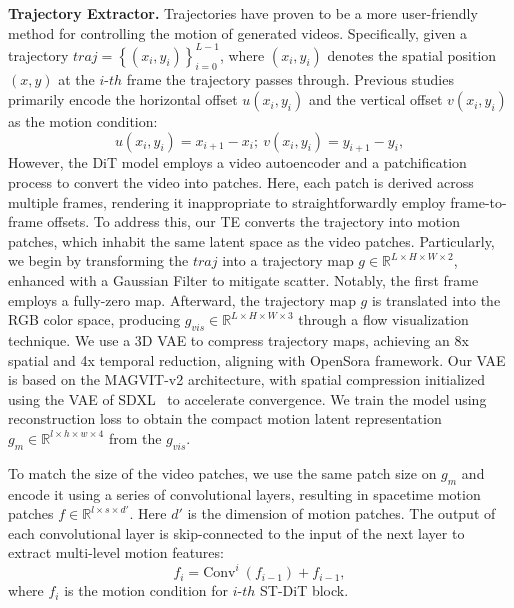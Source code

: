 \noindent \textbf{Trajectory Extractor.} Trajectories have proven to be a more user-friendly method for controlling the motion of generated videos. Specifically, given a trajectory $traj=\left \{ (x_i, y_i) \right \} _{i=0}^{L-1} $, where $(x_i, y_i)$ denotes the spatial position $(x, y)$ at the $i$-$th$ frame the trajectory passes through. Previous studies primarily encode the horizontal offset $u(x_i,y_i)$ and the vertical offset $v(x_i,y_i)$ as the motion condition: 
\begin{equation}
u(x_i,y_i)= x_{i+1} - x_{i}; ~ v(x_i,y_i)= y_{i+1} - y_{i},
\end{equation}
However, the DiT model employs a video autoencoder and a patchification process to convert the video into patches. Here, each patch is derived across multiple frames, rendering it inappropriate to straightforwardly employ frame-to-frame offsets. To address this, our TE converts the trajectory into motion patches, which inhabit the same latent space as the video patches. Particularly, we begin by transforming the $traj$ into a trajectory map $g \in \mathbb{R}^{L \times H \times W \times 2}$, enhanced with a Gaussian Filter to mitigate scatter. Notably, the first frame employs a fully-zero map. Afterward, the trajectory map $g$ is translated into the RGB color space, producing $g_{vis} \in \mathbb{R}^{L \times H \times W \times 3}$ through a flow visualization technique. We use a 3D VAE to compress trajectory maps, achieving an 8x spatial and 4x temporal reduction, aligning with OpenSora framework. Our VAE is based on the MAGVIT-v2 architecture, with spatial compression initialized using the VAE of SDXL~\cite{DBLP:journals/corr/abs-2307-01952} to accelerate convergence. We train the model using reconstruction loss to obtain the compact motion latent representation $g_{m} \in \mathbb{R}^{l \times h \times w \times 4}$ from the $g_{vis}$.

To match the size of the video patches, we use the same patch size on 
$g_{m}$ and encode it using a series of convolutional layers, resulting in spacetime motion patches $f \in \mathbb{R}^{l \times s\times d' }$. Here $d'$ is the dimension of motion patches. The output of each convolutional layer is skip-connected to the input of the next layer to extract multi-level motion features:
\begin{equation}
f_i= \mathrm{Conv}^{i}~(f_{i - 1}) + f_{i - 1},
\end{equation}
where $f_i$ is the motion condition for $i$-$th$ ST-DiT block. 




